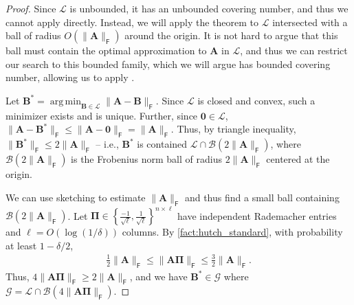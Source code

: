 \documentclass{article}[11pt]
\theoremstyle{definition}
\newcommand{\bv}[1]{\boldsymbol{\mathbf{#1}}}
\newcommand{\Fro}{\mathsf{F}}
\DeclareMathOperator*{\argmin}{arg\,min}
\begin{document}
        
        \begin{proof}
        Since $\mathcal{L}$ is unbounded, it has an unbounded covering number, and thus we cannot apply  directly. Instead, we will apply the theorem to $\mathcal{L}$ intersected with a ball of radius $O(\|\bv{A}\|_\Fro)$ around the origin. It is not hard to argue that this ball must contain the optimal approximation to $\bv A$ in $\mathcal{L}$, and thus we can restrict our search to this bounded family, which we will argue has bounded covering number, allowing us to apply .

        Let $\bv{B^*} = \argmin_{\bv{B} \in \mathcal{L}} \|\bv{A} - \bv{B}\|_\Fro$. Since $\mathcal L$ is closed and convex, such a minimizer exists and is unique. Further, since $\bv{0} \in \mathcal{L}$, $
            \|\bv{A} - \bv{B^*}\|_\Fro \leq \|\bv{A} - \bm{0}\|_\Fro = \|\bv{A}\|_\Fro$. Thus, by triangle inequality, $\|\bv B^*\|_\Fro \le 2 \|\bv A \|_\Fro$ -- i.e., $\bv B^*$ is contained $\mathcal{L} \cap \mathcal{B}(2\|\bv A\|_\Fro)$, where $\mathcal{B}(2\|\bv A\|_\Fro)$ is the Frobenius norm ball of radius $2\|\bv A\|_\Fro$ centered at the origin.

        We can use sketching to estimate $\|\bv{A}\|_{\Fro}$ and thus find a small ball containing $\mathcal{B}(2\|\bv A\|_\Fro)$. Let $\bv{\Pi} \in \left\{\frac{-1}{\sqrt{\ell}}, \frac{1}{\sqrt{\ell}}\right\}^{n \times \ell}$ have independent Rademacher entries and $\ell = O(\log(1/\delta))$ columns. By \cref{fact:hutch_standard},  with probability at least $1 - \delta/2$, \begin{align}\label{eq:camAPi}\frac12\|\bv{A}\|_\Fro \leq \|\bv{A\Pi}\|_\Fro \leq \frac32 \|\bv{A}\|_\Fro.
        \end{align}
        Thus, $4 \|\bv A \bv \Pi \|_\Fro \ge 2\|\bv A\|_\Fro$, and
        we have $\bv B^* \in \mathcal G$ where $\mathcal G = \mathcal{L} \cap \mathcal{B}(4\|\bv{A\Pi}\|_\Fro)$. 


\end{proof}
\end{document}
